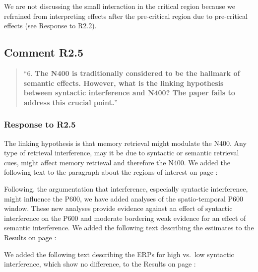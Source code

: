 \documentclass[12pt]{article}
\begin{document}
\begin{quote}
\end{quote}

We are not discussing the small interaction in the critical region because we refrained from interpreting effects after the pre-critical region due to pre-critical effects (see Response to R2.2).

\subsection*{Comment R2.5}
\begin{quote}
``6. \textbf{The N400 is traditionally considered to be the hallmark of semantic effects. However, what is the linking hypothesis between syntactic interference and N400? The paper fails to address this crucial point.}''
\end{quote}

\subsubsection*{Response to R2.5}
The linking hypothesis is that memory retrieval might modulate the N400. Any type of retrieval interference, may it be due to syntactic or semantic retrieval cues, might affect memory retrieval and therefore the N400. We added the following text to the paragraph about the regions of interest on page \pageref{why_n400}:

\begin{quote}
\end{quote}

\vspace{1em}
\noindent Following, the argumentation that interference, especially syntactic interference, might influence the P600, we have added analyses of the spatio-temporal P600 window. These new analyses provide evidence against an effect of syntactic interference on the P600 and moderate bordering weak evidence for an effect of semantic interference. We added the following text describing the estimates to the Results on page \pageref{ERP_results1}:

\begin{quote}
\end{quote}

\noindent We added the following text describing the ERPs for high vs.\ low syntactic interference, which show no difference, to the Results on page \pageref{ERP_results2}:
\end{document}
